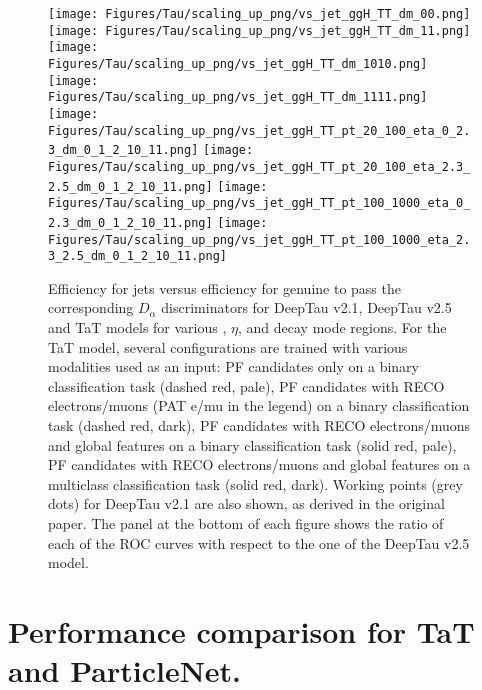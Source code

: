 \begin{figure}[H]
    \centering
    \texttt{[image: Figures/Tau/scaling\_up\_png/vs\_jet\_ggH\_TT\_dm\_00.png]}
    \texttt{[image: Figures/Tau/scaling\_up\_png/vs\_jet\_ggH\_TT\_dm\_11.png]}
    \texttt{[image: Figures/Tau/scaling\_up\_png/vs\_jet\_ggH\_TT\_dm\_1010.png]}
    \texttt{[image: Figures/Tau/scaling\_up\_png/vs\_jet\_ggH\_TT\_dm\_1111.png]}
    \texttt{[image: Figures/Tau/scaling\_up\_png/vs\_jet\_ggH\_TT\_pt\_20\_100\_eta\_0\_2.3\_dm\_0\_1\_2\_10\_11.png]}
    \texttt{[image: Figures/Tau/scaling\_up\_png/vs\_jet\_ggH\_TT\_pt\_20\_100\_eta\_2.3\_2.5\_dm\_0\_1\_2\_10\_11.png]}
    \texttt{[image: Figures/Tau/scaling\_up\_png/vs\_jet\_ggH\_TT\_pt\_100\_1000\_eta\_0\_2.3\_dm\_0\_1\_2\_10\_11.png]}
    \texttt{[image: Figures/Tau/scaling\_up\_png/vs\_jet\_ggH\_TT\_pt\_100\_1000\_eta\_2.3\_2.5\_dm\_0\_1\_2\_10\_11.png]}
    \caption{Efficiency for jets versus efficiency for genuine \tauh to pass the corresponding $D_\alpha$ discriminators for DeepTau v2.1, DeepTau v2.5 and TaT models for various \pt, $\eta$, and \tauh decay mode regions. For the TaT model, several configurations are trained with various modalities used as an input: PF candidates only on a binary classification task (dashed red, pale), PF candidates with RECO electrons/muons (PAT e/mu in the legend) on a binary classification task (dashed red, dark), PF candidates with RECO electrons/muons and global features on a binary classification task (solid red, pale), PF candidates with RECO electrons/muons and global features on a multiclass classification task (solid red, dark). Working points (grey dots) for DeepTau v2.1 are also shown, as derived in the original paper. The panel at the bottom of each figure shows the ratio of each of the ROC curves with respect to the one of the DeepTau v2.5 model.}
\end{figure}

\newpage
\section{Performance comparison for TaT and ParticleNet.}\label{app:tat-bench}


